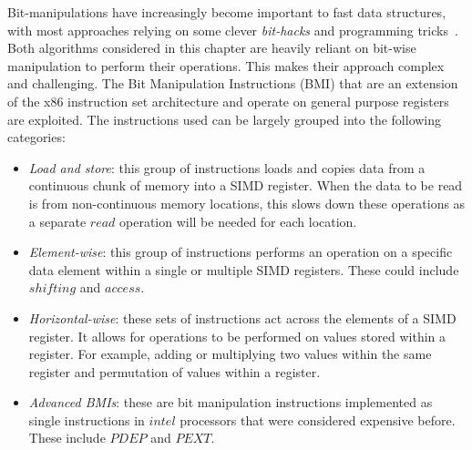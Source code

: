 Bit-manipulations have increasingly become important to fast data structures, with most approaches relying on some clever \textit{bit-hacks} and programming tricks~\cite{hilewitz_2008}. Both algorithms considered in this chapter are heavily reliant on bit-wise manipulation to perform their operations. This makes their approach complex and challenging. The Bit Manipulation Instructions (BMI) that are an extension of the x86 instruction set architecture and operate on general purpose registers are exploited. The instructions used can be largely grouped into the following categories:
\begin{itemize}
    \item \textit{Load and store}: this group of instructions loads and copies data from a continuous chunk of memory into a SIMD register. When the data to be read is from non-continuous memory locations, this slows down these operations as a separate $read$ operation will be needed for each location.
    \item \textit{Element-wise}: this group of instructions performs an operation on a specific data element within a single or multiple SIMD registers. These could include $shifting$ and $access$.
    \item \textit{Horizontal-wise}: these sets of instructions act across the elements of a SIMD register. It allows for operations to be performed on values stored within a register. For example, adding or multiplying two values within the same register and permutation of values within a register.
    \item \textit{Advanced BMIs}: these are bit manipulation instructions implemented as single instructions in $intel$ processors that were considered expensive before. These include $PDEP$ and $PEXT$.
\end{itemize}

\FloatBarrier
